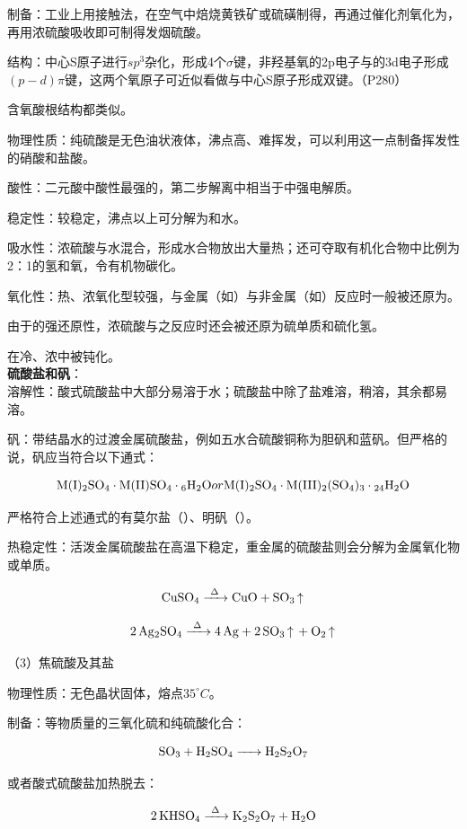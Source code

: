 \documentclass[a4paper,UTF8]{article}
\begin{document}
制备：工业上用接触法，在空气中焙烧黄铁矿或硫磺制得，再通过催化剂氧化为，再用浓硫酸吸收即可制得发烟硫酸。

结构：中心S原子进行$sp^3$杂化，形成4个$\sigma$键，非羟基氧的2p电子与的3d电子形成$(p-d)\pi 键$，这两个氧原子可近似看做与中心S原子形成双键。（P280）

含氧酸根结构都类似。

物理性质：纯硫酸是无色油状液体，沸点高、难挥发，可以利用这一点制备挥发性的硝酸和盐酸。

酸性：二元酸中酸性最强的，第二步解离中相当于中强电解质。

稳定性：较稳定，沸点以上可分解为和水。

吸水性：浓硫酸与水混合，形成水合物放出大量热；还可夺取有机化合物中比例为2：1的氢和氧，令有机物碳化。

氧化性：热、浓氧化型较强，与金属（如）与非金属（如）反应时一般被还原为。

由于的强还原性，浓硫酸与之反应时还会被还原为硫单质和硫化氢。

在冷、浓中被钝化。\\

\textbf{硫酸盐和矾}：\\

溶解性：酸式硫酸盐中大部分易溶于水；硫酸盐中除了盐难溶，稍溶，其余都易溶。

矾：带结晶水的过渡金属硫酸盐，例如五水合硫酸铜称为胆矾和蓝矾。但严格的说，矾应当符合以下通式：

$$ \ce{M(I)2SO4\cdot M(II)SO4\cdot 6H2O} or \ce{M(I)2SO4\cdot M(III)2(SO4)3\cdot 24H2O}$$

严格符合上述通式的有莫尔盐（）、明矾（）。

热稳定性：活泼金属硫酸盐在高温下稳定，重金属的硫酸盐则会分解为金属氧化物或单质。

$$ \ce{CuSO4 ->[\Delta] CuO + SO3\ce{^}} $$

$$ \ce{2Ag2SO4 ->[\Delta] 4Ag + 2SO3\ce{^} + O2\ce{^}} $$

（3）焦硫酸及其盐

物理性质：无色晶状固体，熔点$35^\circ C$。

制备：等物质量的三氧化硫和纯硫酸化合：

$$ \ce{SO3 + H2SO4 -> H2S2O7} $$

或者酸式硫酸盐加热脱去：

$$ \ce{2KHSO4 ->[\Delta] K2S2O7 + H2O} $$
\end{document}
